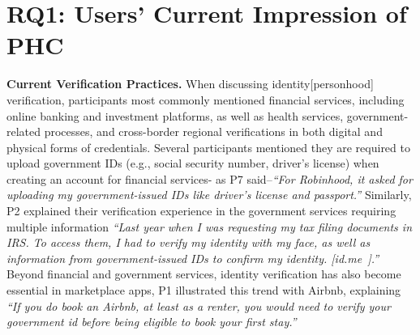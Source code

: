 
\vspace{-2mm}
\section{RQ1: Users’ Current Impression of PHC}
\vspace{-2mm}

\textbf{Current Verification Practices.} 
When discussing identity[personhood] verification, 
participants most commonly mentioned financial services, including online banking and investment platforms, as well as health services, government-related processes, and cross-border regional verifications in both
digital and physical forms of credentials. Several participants mentioned they are required to upload government IDs (e.g., social security number, driver's license) when creating an account for financial services- as P7 said--\textit{``For Robinhood, it asked for uploading my government-issued IDs like driver's license and passport.''} 
Similarly, P2 explained their verification experience in the government services requiring multiple information \textit{``Last year when I was requesting my tax filing documents in IRS. To access them, I had to verify my identity with my face, as well as information from government-issued IDs to confirm my identity. [id.me~\cite{irsIdentityVerification}].''} Beyond financial and government services, identity verification has also become essential in marketplace apps,
P1 illustrated this trend with Airbnb, explaining  \textit{``If you do book an Airbnb, at least as a renter, you would need to verify your government id before being eligible to book your first stay.''} 


